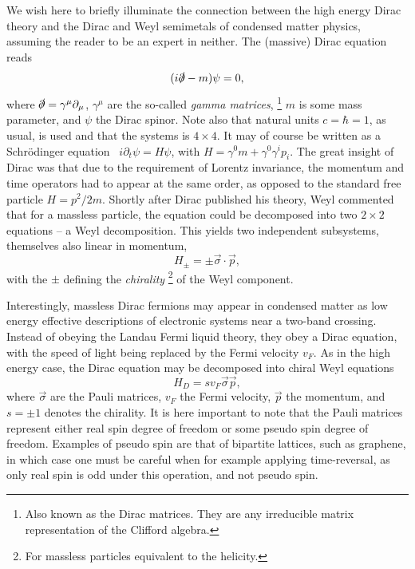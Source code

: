 We wish here to briefly illuminate the connection between the high energy Dirac theory and the Dirac and Weyl semimetals of condensed matter physics, assuming the reader to be an expert in neither.
The (massive) Dirac equation reads
\begin{equation}
  (i \slashed{\partial} - m ) \psi = 0,
\end{equation}
where \( \slashed{\partial} = \gamma^{\mu} \partial_{\mu} \), \( \gamma^{\mu} \) are the so-called \emph{gamma matrices},%
\footnote{Also known as the Dirac matrices. They are any irreducible matrix representation of the Clifford algebra.}
\( m \) is some mass parameter, and \( \psi \) the Dirac spinor.
Note also that natural units \( c = \hbar = 1 \), as usual, is used and that the systems is \( 4\times 4 \).
It may of course be written as a Schrödinger equation~\cite{chernodubThermalTransportGeometry2021} \( i \partial_t \psi = H \psi \), with \( H = \gamma^0 m + \gamma^0\gamma^ip_i \).
The great insight of Dirac was that due to the requirement of Lorentz invariance, the momentum and time operators had to appear at the same order, as opposed to the standard free particle \( H = p^2 /2m \).
Shortly after Dirac published his theory, Weyl commented that for a massless particle, the equation could be decomposed into two \( 2 \times 2 \) equations -- a Weyl decomposition.
This yields two independent subsystems, themselves also linear in momentum,
\begin{equation}
  \label{eq:156}
  H_{\pm} = \pm \vec{\sigma} \cdot \vec{p},
\end{equation}
with the \( \pm \) defining the \emph{chirality}%
\footnote{For massless particles equivalent to the helicity.}
of the Weyl component.

Interestingly, massless Dirac fermions may appear in condensed matter as low energy effective descriptions of electronic systems near a two-band crossing.
Instead of obeying the Landau Fermi liquid theory, they obey a Dirac equation, with the speed of light being replaced by the Fermi velocity $v_F$.
As in the high energy case, the Dirac equation may be decomposed into chiral Weyl equations
\begin{equation}
  \label{eq:3}
H_D = s v_{F} \vec{\sigma} \vec{p},
\end{equation}
where $\vec{\sigma}$ are the Pauli matrices, $v_F$ the Fermi velocity, $\vec{p}$ the momentum, and $s=\pm 1$ denotes the chirality.
It is here important to note that the Pauli matrices represent either real spin degree of freedom or some pseudo spin degree of freedom.
Examples of pseudo spin are that of bipartite lattices, such as graphene, in which case one must be careful when for example applying time-reversal, as only real spin is odd under this operation, and not pseudo spin.

